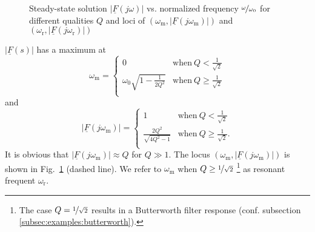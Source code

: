 \documentclass{article}[11pt]
\begin{document}
\begin{figure}[H]
  \caption{Steady-state solution $\left|\underline{F}(j\omega)\right|$ vs. normalized 
    frequency $\nicefrac{\omega}{\omega_0}$ for different qualities $Q$ and loci 
    of $(\omega_{\mathrm{m}}, \left|\underline{F}(j\omega_{\mathrm{m}})\right|)$
    and $(\omega_{\mathrm{r}}, \left|\underline{F}(j\omega_{\mathrm{r}})\right|)$}
  \label{fig:plot-fs}
\end{figure}

$\left|\underline{F}(s)\right|$ has a maximum at 
\begin{equation}
\omega_{\mathrm{m}}=
\begin{cases}
0 & \mathrm{when} \ Q <\frac{1}{\sqrt{2}} \\
\omega_0 \sqrt{1-\frac{1}{2Q^2}} & \mathrm{when} \ Q\geq\frac{1}{\sqrt{2}} \\
\end{cases} 
\end{equation}
and
\begin{equation}
\left|\underline{F}(j\omega_{\mathrm{m}})\right| =
\begin{cases}
1 & \mathrm{when} \ Q <\frac{1}{\sqrt{2}} \\
\frac{2 Q^2}{\sqrt{4Q^2-1}} & \mathrm{when} \ Q\geq\frac{1}{\sqrt{2}}. \\
\end{cases} 
\end{equation}
It is obvious that $\left|\underline{F}(j\omega_{\mathrm{m}})\right| \approx Q$
for $Q \gg 1$.
The locus $(\omega_{\mathrm{m}}, \left|\underline{F}(j\omega_{\mathrm{m}})\right|)$
is shown in Fig.~\ref{fig:plot-fs} (dashed line).
We refer to $\omega_{\mathrm{m}}$ when $Q\geq\nicefrac{1}{\sqrt{2}}$%
\footnote{The case $Q = \nicefrac{1}{\sqrt{2}}$  results
in a Butterworth filter response 
(conf. subsection \ref{subsec:examples:butterworth}).}
as resonant frequent $\omega_{\mathrm{r}}$.
\end{document}
